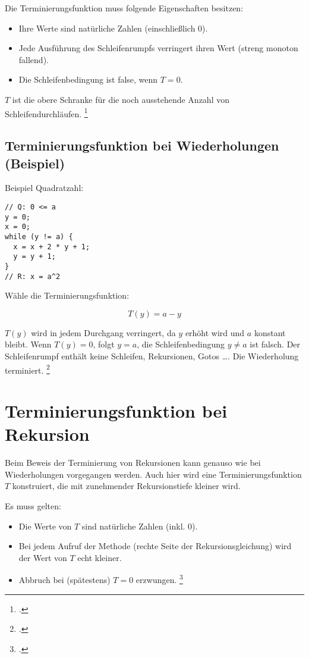 \documentclass{bschlangaul-haupt}
\begin{document}
Die Terminierungsfunktion muss folgende Eigenschaften besitzen:

\begin{itemize}
\item Ihre Werte sind natürliche Zahlen (einschließlich 0).

\item Jede Ausführung des Schleifenrumpfs verringert ihren Wert (streng
monoton fallend).

\item Die Schleifenbedingung ist false, wenn $T = 0$.
\end{itemize}

$T$ ist die obere Schranke für die noch ausstehende Anzahl von
Schleifendurchläufen.
\footcite[Seite 33]{sosy:fs:5}

%

\subsection{Terminierungsfunktion bei Wiederholungen (Beispiel)}

Beispiel Quadratzahl:

\begin{verbatim}
// Q: 0 <= a
y = 0;
x = 0;
while (y != a) {
  x = x + 2 * y + 1;
  y = y + 1;
}
// R: x = a^2
\end{verbatim}

\noindent
Wähle die Terminierungsfunktion:

\begin{displaymath}
T(y) = a - y
\end{displaymath}

\noindent
$T(y)$ wird in jedem Durchgang verringert, da $y$ erhöht wird und $a$
konstant bleibt. Wenn $T(y) = 0$, folgt $y = a$, \dh die
Schleifenbedingung $y \neq a$ ist falsch. Der Schleifenrumpf enthält
keine Schleifen, Rekursionen, Gotos …. Die Wiederholung terminiert.
\footcite[Seite 34]{sosy:fs:5}

\section{Terminierungsfunktion bei Rekursion}

Beim Beweis der Terminierung von Rekursionen kann genauso wie bei
Wiederholungen vorgegangen werden. Auch hier wird eine
Terminierungsfunktion $T$ konstruiert, die mit zunehmender
Rekursionstiefe kleiner wird.

Es muss gelten:
\begin{itemize}
\item Die Werte von $T$ sind natürliche Zahlen (inkl. $0$).

\item Bei jedem Aufruf der Methode (rechte Seite der
Rekursionsgleichung) wird der Wert von $T$ echt kleiner.

\item Abbruch bei (spätestens) $T = 0$ erzwungen.
\footcite[Seite 36]{sosy:fs:5}
\end{itemize}
\end{document}
